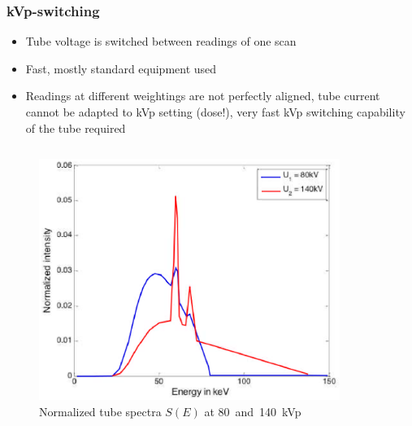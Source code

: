 \begin{frame}
    \frametitle{kVp-switching}
    \vspace{-0.3cm}
    \begin{itemize}
        \item Tube voltage is switched between readings of one scan
        \item {} Fast, mostly standard equipment used
        \item {} Readings at different weightings are not perfectly aligned, tube current cannot be adapted to kVp setting (dose!), very fast kVp switching capability of the tube required
    \end{itemize}
    \begin{columns}[c, onlytextwidth]
        \begin{column}{0.33\textwidth}
            \begin{figure}[]
                \centering
                \includegraphics[width=\textwidth]{images/dual1.eps}
                \caption{Normalized tube spectra $S(E)$ at 80~and~140~kVp}
            \end{figure}
        \end{column}\begin{column}{0.33\textwidth}
            \begin{figure}[]
                \centering

\end{figure}
\end{column}
\end{columns}
\end{frame}
